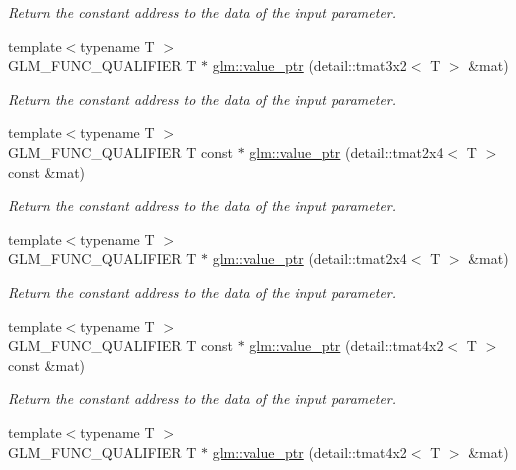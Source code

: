 \begin{DoxyCompactItemize}
\begin{DoxyCompactList}\small\item\em Return the constant address to the data of the input parameter. \end{DoxyCompactList}\item 
{\footnotesize template$<$typename T $>$ }\\G\-L\-M\-\_\-\-F\-U\-N\-C\-\_\-\-Q\-U\-A\-L\-I\-F\-I\-E\-R T $\ast$ \hyperlink{group__gtc__type__ptr_ga241b3c1e7e747ab934e2c38679fe90a5}{glm\-::value\-\_\-ptr} (detail\-::tmat3x2$<$ T $>$ \&mat)
\begin{DoxyCompactList}\small\item\em Return the constant address to the data of the input parameter. \end{DoxyCompactList}\item 
{\footnotesize template$<$typename T $>$ }\\G\-L\-M\-\_\-\-F\-U\-N\-C\-\_\-\-Q\-U\-A\-L\-I\-F\-I\-E\-R T const $\ast$ \hyperlink{group__gtc__type__ptr_ga6b5545ede3accc40f90aa05014406bcf}{glm\-::value\-\_\-ptr} (detail\-::tmat2x4$<$ T $>$ const \&mat)
\begin{DoxyCompactList}\small\item\em Return the constant address to the data of the input parameter. \end{DoxyCompactList}\item 
{\footnotesize template$<$typename T $>$ }\\G\-L\-M\-\_\-\-F\-U\-N\-C\-\_\-\-Q\-U\-A\-L\-I\-F\-I\-E\-R T $\ast$ \hyperlink{group__gtc__type__ptr_gad3ffa3b03348e1c71b509023d0e48436}{glm\-::value\-\_\-ptr} (detail\-::tmat2x4$<$ T $>$ \&mat)
\begin{DoxyCompactList}\small\item\em Return the constant address to the data of the input parameter. \end{DoxyCompactList}\item 
{\footnotesize template$<$typename T $>$ }\\G\-L\-M\-\_\-\-F\-U\-N\-C\-\_\-\-Q\-U\-A\-L\-I\-F\-I\-E\-R T const $\ast$ \hyperlink{group__gtc__type__ptr_ga8278dac512c3e2c638b6713d63c728bb}{glm\-::value\-\_\-ptr} (detail\-::tmat4x2$<$ T $>$ const \&mat)
\begin{DoxyCompactList}\small\item\em Return the constant address to the data of the input parameter. \end{DoxyCompactList}\item 
{\footnotesize template$<$typename T $>$ }\\G\-L\-M\-\_\-\-F\-U\-N\-C\-\_\-\-Q\-U\-A\-L\-I\-F\-I\-E\-R T $\ast$ \hyperlink{group__gtc__type__ptr_gab70c3bd4e9be92b0c9b9668744f0b5c8}{glm\-::value\-\_\-ptr} (detail\-::tmat4x2$<$ T $>$ \&mat)

\end{DoxyCompactItemize}
